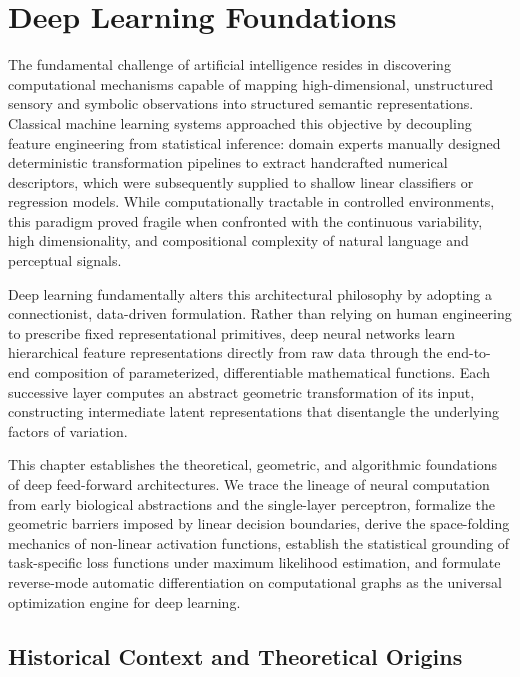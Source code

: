 \documentclass[../../../main.tex]{subfiles}
\begin{document}
\chapter{Deep Learning Foundations}
\label{ch:deep_learning_foundations}

The fundamental challenge of artificial intelligence resides in discovering computational mechanisms capable of mapping high-dimensional, unstructured sensory and symbolic observations into structured semantic representations. Classical machine learning systems approached this objective by decoupling feature engineering from statistical inference: domain experts manually designed deterministic transformation pipelines to extract handcrafted numerical descriptors, which were subsequently supplied to shallow linear classifiers or regression models. While computationally tractable in controlled environments, this paradigm proved fragile when confronted with the continuous variability, high dimensionality, and compositional complexity of natural language and perceptual signals.

Deep learning fundamentally alters this architectural philosophy by adopting a connectionist, data-driven formulation. Rather than relying on human engineering to prescribe fixed representational primitives, deep neural networks learn hierarchical feature representations directly from raw data through the end-to-end composition of parameterized, differentiable mathematical functions. Each successive layer computes an abstract geometric transformation of its input, constructing intermediate latent representations that disentangle the underlying factors of variation.

This chapter establishes the theoretical, geometric, and algorithmic foundations of deep feed-forward architectures. We trace the lineage of neural computation from early biological abstractions and the single-layer perceptron, formalize the geometric barriers imposed by linear decision boundaries, derive the space-folding mechanics of non-linear activation functions, establish the statistical grounding of task-specific loss functions under maximum likelihood estimation, and formulate reverse-mode automatic differentiation on computational graphs as the universal optimization engine for deep learning.

\clearpage
\section{Historical Context and Theoretical Origins}
\label{sec:dl_historical_motivation}
\end{document}
